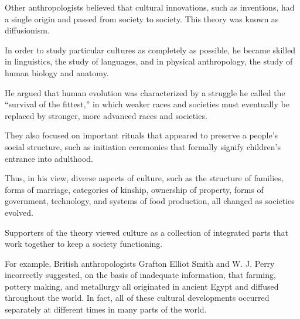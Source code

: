 \begin{listmatch}
	\item
Other anthropologists believed that cultural innovations, such
as inventions, had a single origin and passed from society to society.
This theory was known as diffusionism.


\item 
In order to study particular cultures as completely as possible,
he became skilled
in linguistics,
the study of languages, and in physical anthropology, the study of human
biology and anatomy.


\item 
 He argued that human evolution was characterized by a struggle
he called the ``survival of the fittest,'' in which weaker races and
societies must eventually be replaced by stronger, more advanced races
and societies.


\item 
They also focused on important rituals that appeared to preserve
a people's social structure, such as initiation ceremonies that formally
signify children's entrance into adulthood.


\item 
Thus, in his view, diverse aspects of culture, such as the
structure of families, forms of marriage, categories of kinship,
ownership of property, forms of government, technology, and systems of
food production, all changed as societies evolved.


\item 
Supporters of the theory viewed culture as a collection of
integrated parts that work together to keep a society functioning.


\item 
For example, British anthropologists Grafton Elliot Smith and W.
J. Perry incorrectly suggested, on the basis of inadequate information,
that farming, pottery making, and metallurgy all originated in ancient
Egypt and diffused throughout the world. In fact, all of these cultural
developments occurred separately at different times in many parts of the
world.


\end{listmatch}



